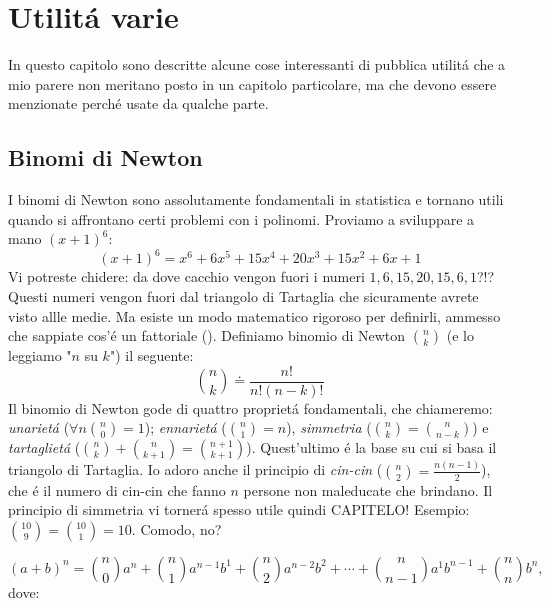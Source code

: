 \label{utilita}
\chapter{Utilit\'a varie}

In questo capitolo sono descritte alcune cose interessanti di pubblica utilit\'a che a mio parere non meritano posto in un capitolo particolare,
ma che devono essere menzionate perch\'e usate da qualche parte.

\label{binominewton}
\section{Binomi di Newton}

I binomi di Newton sono assolutamente fondamentali in statistica e tornano utili quando si affrontano certi problemi con i polinomi. Proviamo a sviluppare a mano $(x+1)^6$:
\begin{equation}
(x+1)^6=x^6+6x^5+15x^4+20x^3+15x^2+6x+1
\end{equation}
Vi potreste chidere: da dove cacchio vengon fuori i numeri $1,6,15,20,15,6,1$?!? Questi numeri vengon fuori dal triangolo di Tartaglia che sicuramente avrete visto allle medie.
Ma esiste un modo matematico rigoroso per definirli, ammesso che sappiate cos'\'e un fattoriale (). Definiamo binomio di Newton $\binom{n}{k}$ (e lo leggiamo "$n$ su $k$") il seguente:
\begin{equation}
\binom{n}{k} \doteq \frac{n!}{n!(n-k)!}
\end{equation}
Il binomio di Newton gode di quattro propriet\'a fondamentali, che chiameremo: {\em unariet\'a} ($\forall n \binom{n}{0}=1$); {\em ennariet\'a} ($\binom{n}{1}=n$),
 {\em simmetria} ($\binom{n}{k}=\binom{n}{n-k}$) e {\em tartagliet\'a} ($\binom{n}{k}+\binom{n}{k+1}=\binom{n+1}{k+1}$). Quest'ultimo \'e la base su cui si basa il triangolo di Tartaglia.
Io adoro anche il principio di {\em cin-cin} ($\binom{n}{2}=\frac{n(n-1)}{2}$), che \'e il numero di cin-cin che fanno $n$ persone non maleducate che brindano.
Il principio di simmetria vi torner\'a spesso utile quindi CAPITELO! Esempio: $\binom{10}{9}=\binom{10}{1}=10$. Comodo, no?

\begin{equation}
(a+b)^n=
	\binom{n}{0}a^n+\binom{n}{1}a^{n-1}b^1+\binom{n}{2}a^{n-2}b^2+\cdots+\binom{n}{n-1}a^1b^{n-1}+\binom{n}{n}b^n,
\end{equation}
dove:


